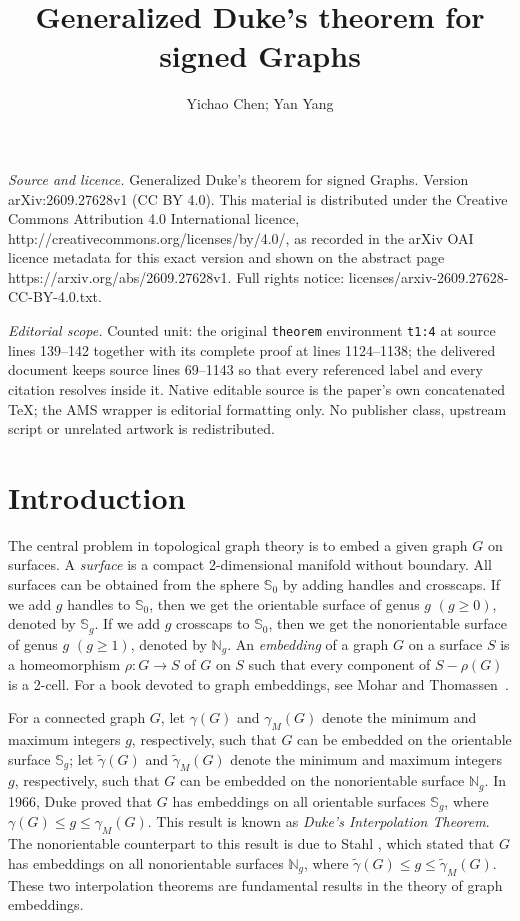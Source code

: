 \documentclass[10pt,a4paper]{amsart}
\begin{document}
\title[Generalized Duke's theorem for signed Graphs]{Generalized Duke's theorem for signed Graphs}
\author{Yichao Chen; Yan Yang}
\date{}
\maketitle
\noindent\emph{Source and licence.} Generalized Duke's theorem for signed Graphs. Version arXiv:2609.27628v1 (CC BY 4.0). This material is distributed under the Creative Commons Attribution 4.0 International licence, http://creativecommons.org/licenses/by/4.0/, as recorded in the arXiv OAI licence metadata for this exact version and shown on the abstract page https://arxiv.org/abs/2609.27628v1. Full rights notice: licenses/arxiv-2609.27628-CC-BY-4.0.txt.\par\smallskip
\noindent\textit{Editorial scope.} Counted unit: the original \texttt{theorem} environment \texttt{t1:4} at source lines 139--142 together with its complete proof at lines 1124--1138; the delivered document keeps source lines 69--1143 so that every referenced label and every citation resolves inside it. Native editable source is the paper's own concatenated TeX; the AMS wrapper is editorial formatting only. No publisher class, upstream script or unrelated artwork is redistributed.
\section{Introduction}
The central problem in topological graph theory is to embed a given graph $G$ on surfaces. A {\it surface} is a compact 2-dimensional manifold without boundary. All surfaces can be obtained from the sphere $\mathbb{S}_0$ by adding handles and crosscaps. If we add $g$ handles to $\mathbb{S}_0$, then we get the orientable surface of genus $g$ $(g\geq 0)$, denoted by $\mathbb{S}_g$. If we add $g$ crosscaps to $\mathbb{S}_0$, then we get the nonorientable surface of genus $g$ $(g\geq 1)$, denoted by $\mathbb{N}_g$. An {\it embedding} of a graph $G$ on a surface $S$ is a homeomorphism $\rho: G\rightarrow S$ of $G$ on $S$ such that every component of $S-\rho(G)$ is a 2-cell.
For a book devoted to graph embeddings, see Mohar and Thomassen~\cite{MT01}.

For a connected graph $G$, let $\gamma(G)$ and $\gamma_{M}(G)$ denote the minimum and maximum integers $g$, respectively, such that $G$ can be embedded on the orientable surface $\mathbb{S}_g$; let $\tilde{\gamma}(G)$ and $\tilde{\gamma}_{M}(G)$ denote the minimum and maximum integers $g$, respectively, such that $G$ can be embedded on the nonorientable surface $\mathbb{N}_g$. In 1966, Duke \cite{Duke1966} proved that $G$ has embeddings on all orientable surfaces $\mathbb{S}_{g}$, where $\gamma(G)\leq g\leq \gamma_{M}(G)$. This result is known as {\it Duke's Interpolation Theorem}. The nonorientable counterpart to this result is due to Stahl \cite{Stahl1978}, which stated that $G$ has embeddings on all nonorientable surfaces $\mathbb{N}_{g}$, where $\tilde{\gamma}(G)\leq g\leq \tilde{\gamma}_{M}(G)$. These two interpolation theorems are fundamental results in the theory of graph embeddings.
\end{document}
